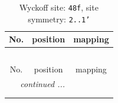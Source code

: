 \documentclass[fleqn,8pt]{jsarticle}
\begin{document}
\renewcommand{\arraystretch}{1.2}
\begin{longtable}{ccc}
\caption{Wyckoff site: {\tt 48f}, site symmetry: {\tt 2..1'}}
 \\
 \hline \hline
No. & position & mapping \\ \hline \endfirsthead

\multicolumn{2}{l}{\tablename\ \thetable{}} \\
 \hline \hline
No. & position & mapping \\ \hline \endhead

 \hline \hline
\multicolumn{2}{r}{\footnotesize\it continued ...} \\ \endfoot

 \hline \hline
\multicolumn{2}{r}{} \\ \endlastfoot


\end{longtable}
\end{document}
